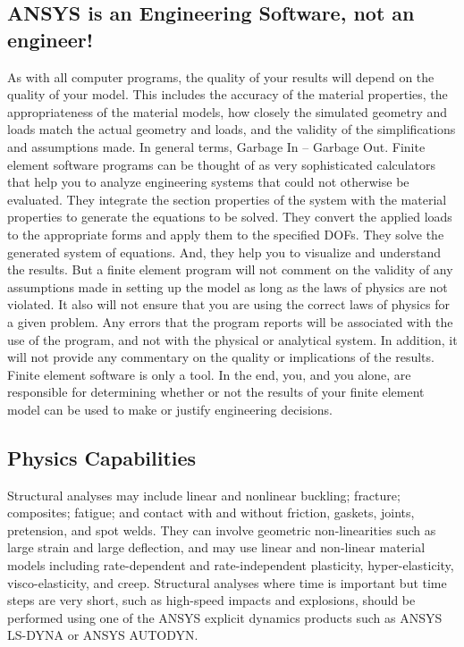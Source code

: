 \documentclass[letterpaper,pdftex]{article}
\begin{document}
\subsection{ANSYS is an Engineering Software, not an engineer!}

As with all computer programs, the quality of your results will depend on the quality of your model. This includes the accuracy of the material properties, the appropriateness of the material models, how closely the simulated geometry and loads match the actual geometry and loads, and the validity of the simplifications and assumptions made. In general terms, Garbage In \--- Garbage Out. Finite element software programs can be thought of as very sophisticated calculators that help you to analyze engineering systems that could not otherwise be evaluated. They integrate the section properties of the system with the material properties to generate the equations to be solved. They convert the applied loads to the appropriate forms and apply them to the specified DOFs. They solve the generated system of equations. And, they help you to visualize and understand the results. But a finite element program will not comment on the validity of any assumptions made in setting up the model as long as the laws of physics are not violated. It also will not ensure that you are using the correct laws of physics for a given problem. Any errors that the program reports will be associated with the use of the program, and not with the physical or analytical system. In addition, it will not provide any commentary on the quality or implications of the results. Finite element software is only a tool. In the end, you, and you alone, are responsible for determining whether or not the results of your finite element model can be used to make or justify engineering decisions.

\subsection{Physics Capabilities}

Structural analyses may include linear and nonlinear buckling; fracture; composites; fatigue; and contact with and without friction, gaskets, joints, pretension, and spot welds. They can involve geometric non-linearities such as large strain and large deflection, and may use linear and non-linear material models including rate-dependent and rate-independent plasticity, hyper-elasticity, visco-elasticity, and creep. Structural analyses where time is important but time steps are very short, such as high-speed impacts and explosions, should be performed using one of the ANSYS explicit dynamics products such as ANSYS LS-DYNA or ANSYS AUTODYN.
\end{document}
